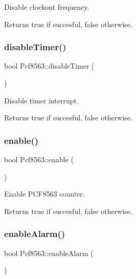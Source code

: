 Disable clockout frequency. 

\begin{DoxyReturn}{Returns}
true if succesful, false otherwise. 
\end{DoxyReturn}
\mbox{\label{namespacePcf8563_ac2c3ca7f3a13516c6549bfc0f6527c6a}} 
\subsubsection{\texorpdfstring{disable\+Timer()}{disableTimer()}}
{\footnotesize\ttfamily bool Pcf8563\+::disable\+Timer (\begin{DoxyParamCaption}{ }\end{DoxyParamCaption})}



Disable timer interrupt. 

\begin{DoxyReturn}{Returns}
true if succesful, false otherwise. 
\end{DoxyReturn}
\mbox{\label{namespacePcf8563_a32420d263d406b766b21bc00dccdc333}} 
\subsubsection{\texorpdfstring{enable()}{enable()}}
{\footnotesize\ttfamily bool Pcf8563\+::enable (\begin{DoxyParamCaption}{ }\end{DoxyParamCaption})}



Enable P\+C\+F8563 counter. 

\begin{DoxyReturn}{Returns}
true if succesful, false otherwise. 
\end{DoxyReturn}
\mbox{\label{namespacePcf8563_a6e196fe410c080e4f6e20aadbe279637}} 
\subsubsection{\texorpdfstring{enable\+Alarm()}{enableAlarm()}}
{\footnotesize\ttfamily bool Pcf8563\+::enable\+Alarm (\begin{DoxyParamCaption}{ }\end{DoxyParamCaption})}




